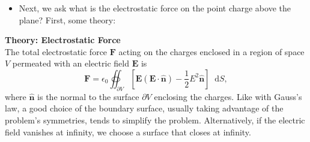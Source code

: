 \documentclass[11pt, a4paper]{article}
\newcommand{\diff}{\mathop{}\!\mathrm{d}} %
\renewcommand{\vec}[1]{\bm{#1}} %
\newcommand{\uvec}[1]{\hat{\vec{#1}}} %
\newcommand{\E}{\vec{E}}  %
\newcommand{\ee}{\epsilon_{0}}  %
\begin{document}
\begin{itemize}
	\item Next, we ask what is the electrostatic force on the point charge above the plane? First, some theory:
\end{itemize}  
\textbf{Theory: Electrostatic Force}\\[2mm]
The total electrostatic force $ \vec{F} $ acting on the charges enclosed in a region of space $ V $ permeated with an electric field $ \E $ is
\begin{equation*}
	\vec{F} = \ee \oiint_{\partial V} \left[\E(\E \cdot \uvec{n}) - \frac{1}{2}E^{2}\uvec{n}\right]\diff S,
\end{equation*}
where $ \uvec{n} $ is the normal to the surface $ \partial V $ enclosing the charges. Like with Gauss's law, a good choice of the boundary surface, usually taking advantage of the problem's symmetries, tends to simplify the problem. Alternatively, if the electric field vanishes at infinity, we choose a surface that closes at infinity. 
\end{document}

